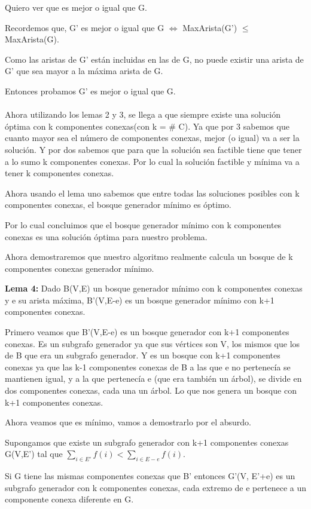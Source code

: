 Quiero ver que es mejor o igual que G.

Recordemos que, G' es mejor o igual que G $\Leftrightarrow$ MaxArista(G') $\leq$ MaxArista(G).

Como las aristas de G' están incluidas en las de G, no puede existir una arista de G' que sea mayor a la máxima arista de G.

Entonces probamos G' es mejor o igual que G. \\ \\

Ahora utilizando los lemas 2 y 3, se llega a que siempre existe una solución óptima con k componentes conexas(con k = \# C).
Ya que por 3 sabemos que cuanto mayor sea el número de componentes conexas, mejor (o igual) va a ser la solución. Y por dos sabemos que para que la solución sea factible tiene que tener a lo sumo k componentes conexas. Por lo cual la solución factible y mínima va a tener k componentes conexas. 

Ahora usando el lema uno sabemos que entre todas las soluciones posibles con k componentes conexas, el bosque generador mínimo es óptimo.

Por lo cual concluimos que el bosque generador mínimo con k componentes conexas es una solución óptima para nuestro problema.

Ahora demostraremos que nuestro algoritmo realmente calcula un bosque de k componentes conexas generador mínimo.

\textbf{Lema 4:} Dado B(V,E) un bosque generador mínimo con k componentes conexas y e su arista máxima, B'(V,E-e) es un bosque generador mínimo con k+1 componentes conexas.

Primero veamos que B'(V,E-e) es un bosque generador con k+1 componentes conexas. Es un subgrafo generador ya que sus vértices son V, los mismos que los de B que era un subgrafo generador. Y es un bosque con k+1 componentes conexas ya que las k-1 componentes conexas de B a las que e no pertenecía se mantienen igual, y a la que pertenecía e (que era también un árbol), se divide en dos componentes conexas, cada una un árbol. Lo que nos genera un bosque con k+1 componentes conexas.

Ahora veamos que es mínimo, vamos a demostrarlo por el absurdo.

Supongamos que existe un subgrafo generador con k+1 componentes conexas G(V,E') tal que $\sum_{i \in E'} f(i) < \sum_{i \in E-e} f(i)$.

Si G tiene las mismas componentes conexas que B' entonces G'(V, E'+e) es un subgrafo generador con k componentes conexas, cada extremo de e pertenece a un componente conexa diferente en G.

